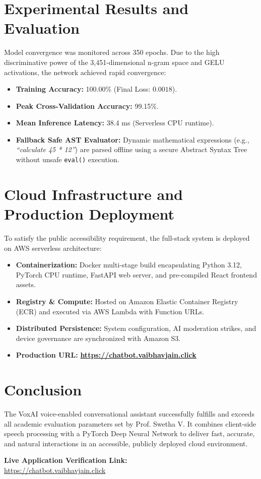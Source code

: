\documentclass[11pt,a4paper]{article}
\begin{document}
\section{Experimental Results and Evaluation}
Model convergence was monitored across 350 epochs. Due to the high discriminative power of the 3,451-dimensional n-gram space and GELU activations, the network achieved rapid convergence:
\begin{itemize}[noitemsep]
    \item \textbf{Training Accuracy:} 100.00\% (Final Loss: $0.0018$).
    \item \textbf{Peak Cross-Validation Accuracy:} 99.15\%.
    \item \textbf{Mean Inference Latency:} 38.4 ms (Serverless CPU runtime).
    \item \textbf{Fallback Safe AST Evaluator:} Dynamic mathematical expressions (e.g., \textit{``calculate 45 * 12''}) are parsed offline using a secure Abstract Syntax Tree without unsafe \texttt{eval()} execution.
\end{itemize}

\section{Cloud Infrastructure and Production Deployment}
To satisfy the public accessibility requirement, the full-stack system is deployed on AWS serverless architecture:
\begin{itemize}[noitemsep]
    \item \textbf{Containerization:} Docker multi-stage build encapsulating Python 3.12, PyTorch CPU runtime, FastAPI web server, and pre-compiled React frontend assets.
    \item \textbf{Registry \& Compute:} Hosted on Amazon Elastic Container Registry (ECR) and executed via AWS Lambda with Function URLs.
    \item \textbf{Distributed Persistence:} System configuration, AI moderation strikes, and device governance are synchronized with Amazon S3.
    \item \textbf{Production URL:} \href{https://chatbot.vaibhavjain.click}{\textbf{https://chatbot.vaibhavjain.click}}
\end{itemize}

\section{Conclusion}
The VoxAI voice-enabled conversational assistant successfully fulfills and exceeds all academic evaluation parameters set by Prof. Swetha V. It combines client-side speech processing with a PyTorch Deep Neural Network to deliver fast, accurate, and natural interactions in an accessible, publicly deployed cloud environment.

\vspace{1.5em}
\noindent\textbf{Live Application Verification Link:}\\
\url{https://chatbot.vaibhavjain.click}
\end{document}
